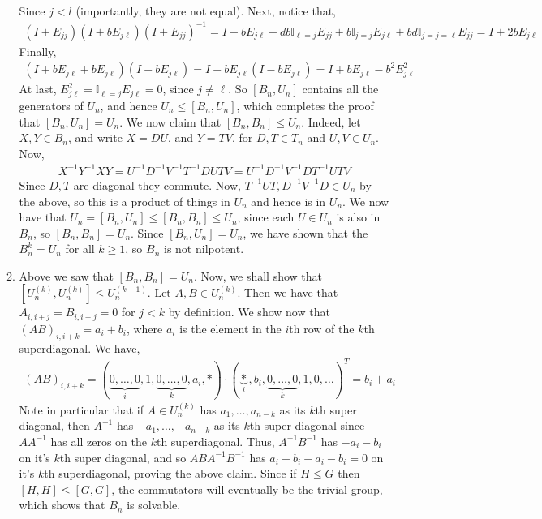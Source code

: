 \documentclass[12pt]{article}
\theoremstyle{definitionstyle}
\def\mbb#1{\mathbb{#1}}
\begin{document}
\begin{enumerate}[leftmargin=\labelsep]
\begin{enumerate}
\begin{align*}
			\end{align*}
			Since $j < l$ (importantly, they are not equal). Next, notice that,
			\begin{align*}
				(I+E_{jj})(I+bE_{j\ell})(I+E_{jj})^{-1} = I + bE_{j\ell} + db\mbb I_{\ell = j} E_{jj} + b \mbb I_{j=j} E_{j\ell} + bd\mbb I_{j=j=\ell} E_{jj} = I + 2bE_{j\ell}
			\end{align*}
			Finally,
			\begin{align*}
				(I+bE_{j\ell}+bE_{j\ell})(I-bE_{j\ell}) = I + bE_{j\ell}(I-bE_{j\ell}) = I + bE_{j\ell} - b^2E_{j\ell}^2
			\end{align*}
			At last, $E_{j\ell}^2 = \mbb I_{\ell=j} E_{j\ell} = 0$, since $j \neq \ell$. So $[B_n, U_n]$ contains all the generators of $U_n$, and hence $U_n \leq [B_n, U_n]$, which completes the proof that $[B_n, U_n] = U_n$. We now claim that $[B_n, B_n] \leq U_n$. Indeed, let $X, Y \in B_n$, and write $X = DU$, and $Y = TV$, for $D, T \in T_n$ and $U, V \in U_n$. Now,
			\begin{align*}
				X^{-1}Y^{-1}XY = U^{-1}D^{-1} V^{-1}T^{-1} DU TV = U^{-1} D^{-1}V^{-1}D T^{-1}UT V
			\end{align*}
			Since $D, T$ are diagonal they commute. Now, $T^{-1}UT, D^{-1}V^{-1}D \in U_n$ by the above, so this is a product of things in $U_n$ and hence is in $U_n$. We now have that $U_n = [B_n, U_n] \leq [B_n, B_n] \leq U_n$, since each $U \in U_n$ is also in $B_n$, so $[B_n, B_n] = U_n$. Since $[B_n, U_n] = U_n$, we have shown that the $B_n^{k} = U_n$ for all $k \geq 1$, so $B_n$ is not nilpotent.
			
			\item Above we saw that $[B_n, B_n] = U_n$. Now, we shall show that $[U_n^{(k)}, U_n^{(k)}] \leq U_n^{(k-1)}$. Let $A,B \in U_n^{(k)}$. Then we have that $A_{i,i+j} = B_{i,i+j} = 0$ for $j < k$ by definition. We show now that $(AB)_{i,i+k} = a_i+b_i$, where $a_i$ is the element in the $i$th row of the $k$th superdiagonal. We have,
			\begin{align*}
				(AB)_{i,i+k} = (\underbrace{0, \ldots, 0}_i, 1, \underbrace{0, \ldots, 0}_k, a_i, *) \cdot (\underbrace{*}_i, b_i, \underbrace{0, \ldots, 0}_k, 1, 0, \ldots)^T = b_i+a_i
			\end{align*}
			Note in particular that if $A \in U_n^{(k)}$ has $a_1, \ldots, a_{n-k}$ as its $k$th super diagonal, then $A^{-1}$ has $-a_1, \ldots, -a_{n-k}$ as its $k$th super diagonal since $AA^{-1}$ has all zeros on the $k$th superdiagonal. Thus, $A^{-1}B^{-1}$ has $-a_i-b_i$ on it's $k$th super diagonal, and so $ABA^{-1}B^{-1}$ has $a_i+b_i-a_i-b_i = 0$ on it's $k$th superdiagonal, proving the above claim. Since if $H \leq G$ then $[H,H] \leq [G,G]$, the commutators will eventually be the trivial group, which shows that $B_n$ is solvable.
			

\end{enumerate}
\end{enumerate}
\end{document}
